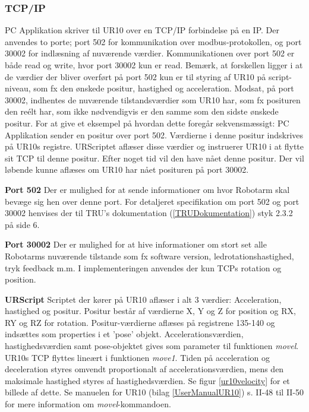 \subsubsection{TCP/IP}
PC Applikation skriver til UR10 over en TCP/IP forbindelse på en IP. Der anvendes to porte; port 502 for kommunikation over modbus-protokollen, og port 30002 for indlæsning af nuværende værdier.
Kommunikationen over port 502 er både read og write, hvor port 30002 kun er read. 
Bemærk, at forskellen  ligger i at de værdier der bliver overført på port 502 kun er til styring af UR10 på script-niveau, som fx den ønskede positur, hastighed og acceleration. Modsat, på port 30002, indhentes de nuværende tilstandsværdier som UR10 har, som fx posituren den reélt har, som ikke nødvendigvis er den samme som den sidste ønskede positur.
For at give et eksempel på hvordan dette foregår sekvensmæssigt:
PC Applikation sender en positur over port 502. Værdierne i denne positur indskrives på UR10s registre.
URScriptet aflæser disse værdier og instruerer UR10 i at flytte sit TCP til denne positur.
Efter noget tid vil den have nået denne positur. Der vil løbende kunne aflæses om UR10 har nået posituren på port 30002.

\textbf{Port 502}
Der er mulighed for at sende informationer om hvor Robotarm skal bevæge sig hen over denne port. For detaljeret specifikation om port 502 og port 30002 henvises der til TRU's dokumentation (\ref{TRUDokumentation}) styk 2.3.2 på side 6.

\textbf{Port 30002}
Der er mulighed for at hive informationer om stort set alle Robotarms nuværende tilstande som fx software version, ledrotationshastighed, tryk feedback m.m. I implementeringen anvendes der kun TCPs rotation og position.

\textbf{URScript} \newline
Scriptet der kører på UR10 aflæser i alt 3 værdier:
Acceleration, hastighed og positur.
Positur består af værdierne X, Y og Z for position og RX, RY og RZ for rotation.
Positur-værdierne aflæses på registrene 135-140 og indsættes som properties i et 'pose' objekt.
Accelerationsværdien, hastighedsværdien samt pose-objektet gives som parameter til funktionen \textit{movel}.
UR10s TCP flyttes lineært i funktionen \textit{move1}. Tiden på acceleration og deceleration styres omvendt proportionalt af accelerationsværdien, mens den maksimale hastighed styres af hastighedsværdien. Se figur \ref{ur10velocity} for et billede af dette. Se manuelen for UR10 (bilag \ref{UserManualUR10}) s. II-48 til II-50 for mere information om \textit{movel}-kommandoen.

